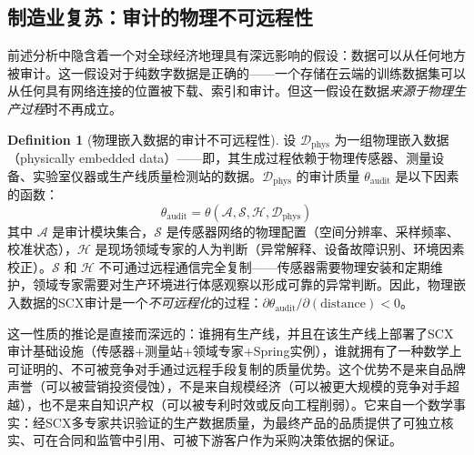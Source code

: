 \documentclass[12pt,a4paper]{ctexart}
\theoremstyle{definition}
\newtheorem{definition}{Definition}[section]
\theoremstyle{remark}
\begin{document}
\subsection{制造业复苏：审计的物理不可远程性}

前述分析中隐含着一个对全球经济地理具有深远影响的假设：数据可以从任何地方被审计。这一假设对于纯数字数据是正确的——一个存储在云端的训练数据集可以从任何具有网络连接的位置被下载、索引和审计。但这一假设在数据\textit{来源于物理生产过程}时不再成立。

\begin{definition}[物理嵌入数据的审计不可远程性]
设 $\mathcal{D}_{\text{phys}}$ 为一组物理嵌入数据（physically embedded data）——即，其生成过程依赖于物理传感器、测量设备、实验室仪器或生产线质量检测站的数据。$\mathcal{D}_{\text{phys}}$ 的审计质量 $\theta_{\text{audit}}$ 是以下因素的函数：
\begin{equation}
\theta_{\text{audit}} = \theta\left( \mathcal{A}, \mathcal{S}, \mathcal{H}, \mathcal{D}_{\text{phys}} \right)
\end{equation}
其中 $\mathcal{A}$ 是审计模块集合，$\mathcal{S}$ 是传感器网络的物理配置（空间分辨率、采样频率、校准状态），$\mathcal{H}$ 是现场领域专家的人为判断（异常解释、设备故障识别、环境因素校正）。$\mathcal{S}$ 和 $\mathcal{H}$ 不可通过远程通信完全复制——传感器需要物理安装和定期维护，领域专家需要对生产环境进行体感观察以形成可靠的异常判断。因此，物理嵌入数据的SCX审计是一个\textit{不可远程化}的过程：$\partial \theta_{\text{audit}} / \partial (\text{distance}) < 0$。
\end{definition}

这一性质的推论是直接而深远的：谁拥有生产线，并且在该生产线上部署了SCX审计基础设施（传感器+测量站+领域专家+Spring实例），谁就拥有了一种数学上可证明的、不可被竞争对手通过远程手段复制的质量优势。这个优势不是来自品牌声誉（可以被营销投资侵蚀），不是来自规模经济（可以被更大规模的竞争对手超越），也不是来自知识产权（可以被专利时效或反向工程削弱）。它来自一个数学事实：经SCX多专家共识验证的生产数据质量，为最终产品的品质提供了可独立核实、可在合同和监管中引用、可被下游客户作为采购决策依据的保证。
\end{document}
